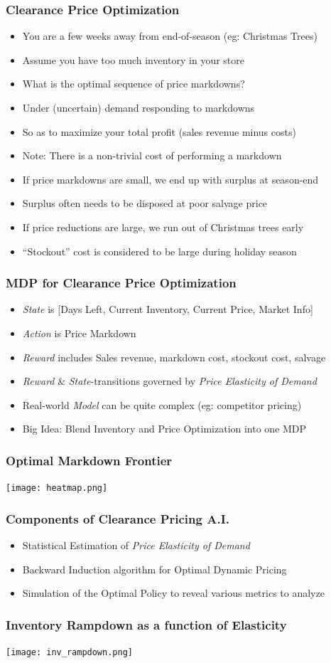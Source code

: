 \documentclass[handout]{beamer}
\begin{document}
\begin{frame}
\frametitle{Clearance Price Optimization}
\pause
\begin{itemize}[<+->]
\item You are a few weeks away from end-of-season (eg: Christmas Trees)
\item Assume you have too much inventory in your store
\item What is the optimal sequence of price markdowns?
\item Under (uncertain) demand responding to markdowns
\item So as to maximize your total profit (sales revenue minus costs)
\item Note: There is a non-trivial cost of performing a markdown
\item If price markdowns are small, we end up with surplus at season-end
\item Surplus often needs to be disposed at poor salvage price
\item If price reductions are large, we run out of Christmas trees early
\item ``Stockout'' cost is considered to be large during holiday season
\end{itemize}
\end{frame}

\begin{frame}
\frametitle{MDP for Clearance Price Optimization}
\pause
\begin{itemize}[<+->]
\item {\em State} is [Days Left, Current Inventory, Current Price, Market Info]
\item {\em Action} is Price Markdown
\item {\em Reward} includes Sales revenue, markdown cost, stockout cost, salvage
\item {\em Reward} \& {\em State}-transitions governed by {\em Price Elasticity of Demand}
\item Real-world {\em Model} can be quite complex (eg: competitor pricing)
\item Big Idea: Blend Inventory and Price Optimization into one MDP
\end{itemize}
\end{frame}

\begin{frame}
\frametitle{Optimal Markdown Frontier}
\texttt{[image: heatmap.png]}
\end{frame}

\begin{frame}
\frametitle{Components of Clearance Pricing A.I.}
\pause
\begin{itemize}[<+->]
\item Statistical Estimation of {\em Price Elasticity of Demand}
\item Backward Induction algorithm for Optimal Dynamic Pricing
\item Simulation of the Optimal Policy to reveal various metrics to analyze
\end{itemize}
\end{frame}

\begin{frame}
\frametitle{Inventory Rampdown as a function of Elasticity}
\texttt{[image: inv\_rampdown.png]}
\end{frame}
\end{document}
